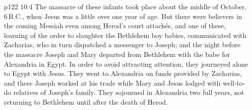 \vs p122 10:4 The massacre of these infants took place about the middle of October, 6\,B.C., when Jesus was a little over one year of age. But there were believers in the coming Messiah even among Herod’s court attachés, and one of these, learning of the order to slaughter the Bethlehem boy babies, communicated with Zacharias, who in turn dispatched a messenger to Joseph; and the night before the massacre Joseph and Mary departed from Bethlehem with the babe for Alexandria in Egypt. In order to avoid attracting attention, they journeyed alone to Egypt with Jesus. They went to Alexandria on funds provided by Zacharias, and there Joseph worked at his trade while Mary and Jesus lodged with well\hyp{}to\hyp{}do relatives of Joseph’s family. They sojourned in Alexandria two full years, not returning to Bethlehem until after the death of Herod.
\quizlink
